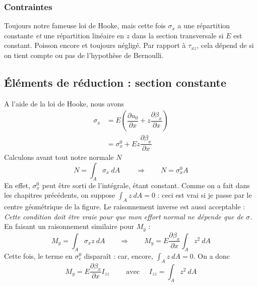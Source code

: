 		\subsubsection{Contraintes}
		Toujours notre fameuse loi de Hooke, mais cette fois $\sigma_x$ a une 
		répartition constante \textit{et} une répartition linéaire en $z$ dans 
		la section transversale si $E$ est constant. Poisson encore et toujours 
		négligé. Par rapport à $\tau_{xz}$, cela dépend de si on tient compte 
		ou pas de l'hypothèse de Bernoulli.
		
	\subsection{Éléments de réduction : section constante}
	A l'aide de la loi de Hooke, nous avons
	\begin{equation}
	\begin{array}{ll}
	\sigma_x &=\displaystyle E\left(\dfrac{\partial u_0}{\partial x}+z\dfrac{
	\partial\beta_x}{\partial x}\right)\\
	&= \displaystyle \sigma_x^0 + Ez\dfrac{\partial\beta_x}{\partial x}
	\end{array}
	\end{equation}
	Calculons avant tout notre normale $N$
	\begin{equation}
	N = \int_A\sigma_x\ dA\qquad\ \Longrightarrow\qquad N = \sigma_x^0A
	\end{equation}
	En effet, $\sigma_x^0$ peut être sorti de l'intégrale, étant constant. 
	Comme on a fait dans les chapitres précédents, on suppose $\int_A z\ dA =0$ : 
	ceci est vrai si je passe par le centre géométrique de la figure. Le 
	raisonnement inverse est aussi acceptable : \textit{Cette condition doit 
	être vraie pour que mon effort normal ne dépende que de $\sigma$.}\\
	
	En faisant un raisonnement similaire pour $M_y$ :
	\begin{equation}
	M_y = \int_A \sigma_xz\ dA \qquad\Longrightarrow\qquad M_y = E\dfrac{
	\partial \beta_x}{\partial x}\int_A z^2\ dA
	\end{equation}
	Cette fois, le terme en $\sigma_c^0$ disparaît : car, encore, $\int_A z\ dA=0$.
	On a donc 
	\begin{equation}
	M_y = E\dfrac{\partial \beta_x}{\partial x}I_{zz}\qquad\text{ avec }\quad 
	I_{zz} = \int_A z^2\ dA
	\end{equation}		
	
